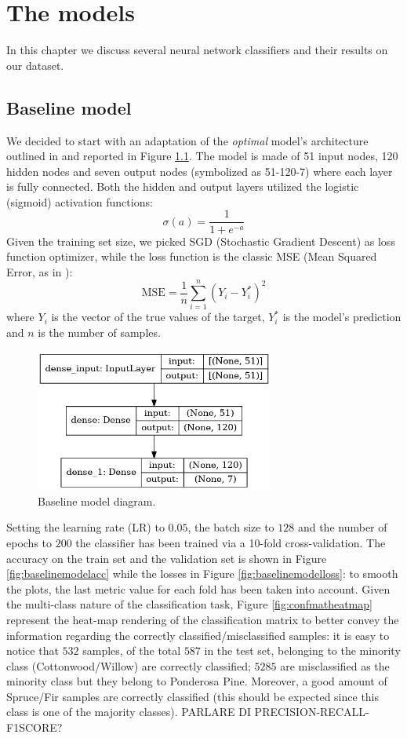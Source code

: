\chapter{The models}
In this chapter we discuss several neural network classifiers and their results on our dataset.
\section{Baseline model}
We decided to start with an adaptation of the \textit{optimal} model's architecture outlined in \cite{blackardDean} and reported in Figure \ref{fig:baselinemodel}. The model is made of 51 input nodes, 120 hidden nodes and seven output nodes (symbolized as 51-120-7) where each layer is fully connected. Both the hidden and output layers utilized the logistic (sigmoid) activation functions:
$$
\sigma(a) = \frac{1}{1 + e^{-a}}
$$
Given the training set size, we picked SGD (Stochastic Gradient Descent) as loss function optimizer, while the loss function is the classic MSE (Mean Squared Error, as in \cite{blackardDean}):
\begin{equation}
\text{MSE} = \frac{1}{n}\sum_{i=1}^{n}(Y_i - Y^{*}_{i})^2
\end{equation}
where $Y_i$ is the vector of the true values of the target, $Y^{*}_{i}$ is the model's prediction and $n$ is the number of samples.
\begin{figure}
	\centering
	\includegraphics[width=0.7\textwidth]{./TeX_files/img/baselinemodel.png}
	\caption{Baseline model diagram.}
	\label{fig:baselinemodel}
\end{figure}
Setting the learning rate (LR) to $0.05$, the batch size to $128$ and the number of epochs to $200$ the classifier has been trained via a 10-fold cross-validation. The accuracy on the train set and the validation set is shown in Figure \ref{fig:baselinemodelacc} while the losses in Figure \ref{fig:baselinemodelloss}: to smooth the plots, the last metric value for each fold has been taken into account. Given the multi-class nature of the classification task, Figure \ref{fig:confmatheatmap} represent the heat-map rendering of the classification matrix to better convey the information regarding the correctly classified/misclassified samples: it is easy to notice that $532$ samples, of the total $587$ in the test set, belonging to the minority class (Cottonwood/Willow) are correctly classified; $5285$ are misclassified as the minority class but they belong to Ponderosa Pine. Moreover, a good amount of Spruce/Fir samples are correctly classified (this should be expected since this class is one of the majority classes). PARLARE DI PRECISION-RECALL-F1SCORE?
